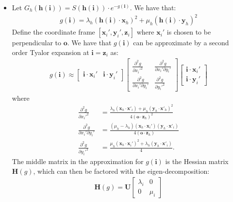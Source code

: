 \documentclass[10pt]{article}
\newcommand{\ve}[1]{\mathbf{#1}}
\begin{document}
\begin{itemize}
    \item Let $G_h(\ve{h}(\ve{i})) = S(\ve{h}(\ve{i})) \cdot e^{-g(\ve{i})}$.  We have that:
    \begin{align*}
      g(\ve{i}) = \lambda_h (\ve{h}(\ve{i}) \cdot \ve{x}_h)^2 + \mu_h (\ve{h}(\ve{i}) \cdot \ve{y}_h)^2
    \end{align*}
    Define the coordinate frame $[\ve{x}_i', \ve{y}_i', \ve{z}_i]$ where $\ve{x}_i'$ is chosen to be perpendicular to $\ve{o}$.  We have that $g(\ve{i})$ can be approximate by a second order Tyalor expansion at $\ve{i} = \ve{z}_i$ as:
    \begin{align*}
      g(\ve{i}) 
      \approx 
      \begin{bmatrix}
        \ve{i} \cdot \ve{x}_i' &
        \ve{i} \cdot \ve{y}_i'
      \end{bmatrix}
      \begin{bmatrix}
        \frac{\partial^2 g}{\partial x_i'^2} & \frac{\partial^2 g}{\partial x_i' \partial y_i'} \\
        \frac{\partial^2 g}{\partial x_i' \partial y_i'} & \frac{\partial^2 g}{\partial y_i'^2} 
      \end{bmatrix}
      \begin{bmatrix}
        \ve{i} \cdot \ve{x}_i' \\
        \ve{i} \cdot \ve{y}_i'
      \end{bmatrix}
    \end{align*}
    where
    \begin{align*}
      \frac{\partial^2 g}{\partial x_i'^2} 
      &= \frac{\lambda_h(\ve{x}_h \cdot \ve{x}'_i) + \mu_h (\ve{y}_h \cdot \ve{x}'_h)^2}{4(\ve{o} \cdot \ve{z}_h)^2} \\
      \frac{\partial^2 g}{\partial x_i' \partial y_i'}
      &= \frac{(\mu_h - \lambda_h)(\ve{x}_h \cdot \ve{x}_i')(\ve{y}_h \cdot \ve{x}'_i)}{4(\ve{o} \cdot \ve{z}_h)} \\
      \frac{\partial^2 g}{\partial y_i'^2}
      &= \frac{\mu_h(\ve{x}_h \cdot \ve{x}_i')^2 + \lambda_h(\ve{y}_h \cdot \ve{x}'_i)}{4}.
    \end{align*}
    The middle matrix in the approximation for $g(\ve{i})$ is the Hessian matrix $\ve{H}(g)$, which can then be factored with the eigen-decomposition:
    \begin{align*}
      \ve{H}(g) = \ve{U} \begin{bmatrix}
        \lambda_i & 0 \\
        0 & \mu_i
      \end{bmatrix}

\end{align*}
\end{itemize}
\end{document}
